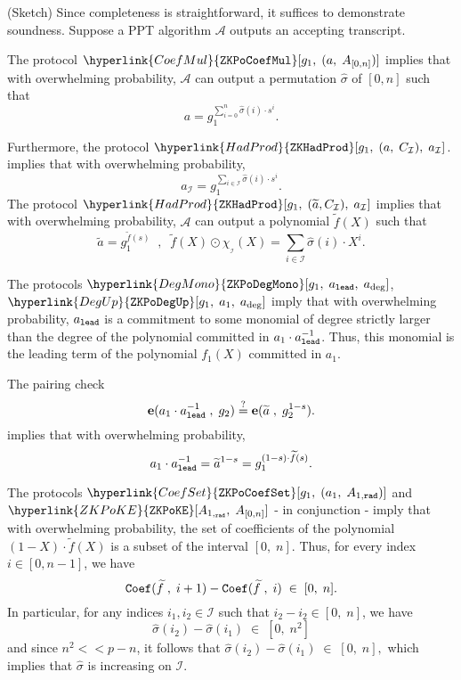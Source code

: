 \documentclass[11pt, lettersize, notitlepage, leqno, footskip=0.6cm]{article}
\newcommand{\wti}{\widetilde}
\newcommand{\mc}{\mathcal}
\newcommand{\mbf}{\mathbf}
\newcommand{\what}{\widehat}
\newcommand{\vs}{\vspace{-0.15cm}}
\newcommand{\noin}{\noindent}
\newcommand{\op}{overwhelming probability}
\newcommand{\sta}{\stackrel{?}{=}}
\newcommand{\e}{\mbf{e}}
\numberwithin{equation}{section}
\begin{document}
\begin{prf} (Sketch) Since completeness is straightforward, it suffices to demonstrate soundness. Suppose a PPT algorithm $\mc{A}$ outputs an accepting transcript.

The protocol $\hyperlink{CoefMul}{\tt{ZKPoCoefMul}}[g_1,\;(a,\;A_{[0,n]})]$ implies that with \op, $\mc{A}$ can output a permutation $\what{\sigma}$ of $[0,n]$ such that \vs $$ a = g_1^{ \sum\limits_{i=0}^n\what{\sigma}(i)\cdot s^i}. $$

\noin Furthermore, the protocol $\hyperlink{HadProd}{\tt{ZKHadProd}}[g_1,\;(a,\;C_{\mc{I}}),\;a_{\mc{I}}]$. implies that with \op, \vs $$  a_{\mc{I}} = g_1^{\sum\limits_{i\in\mc{I}} \what{\sigma}(i)\cdot s^i}.  $$ The protocol $\hyperlink{HadProd}{\tt{ZKHadProd}}[g_1,\;(\wti{a}, C_{\mc{I}}),\;a_{\mc{I}}]$ implies that with \op, $\mc{A}$ can output a polynomial $\wti{f}(X)$ such that $$ \wti{a} = g_1^{\wti{f}(s)}\;\;,\;\;   \wti{f}(X)\odot \chi_{_{\mc{I}}}(X) = \sum\limits_{i\in\mc{I}} \what{\sigma}(i)\cdot X^i . $$

The protocols $\hyperlink{DegMono}{\tt{ZKPoDegMono}}[g_1,\;a_{\tt{lead}},\; a_{\deg}]$, $\hyperlink{DegUp}{\tt{ZKPoDegUp}}[g_1,\;a_1,\; a_{\deg}]$ imply that with \op, $a_{\tt{lead}}$ is a commitment to some monomial of degree strictly larger than the degree of the polynomial committed in $a_1\cdot a_{\tt{lead}}^{-1}$. Thus, this monomial is the leading term of the polynomial $f_1(X)$ committed in $a_1$. 


The pairing check \vs $$ \e(a_1\cdot a_{\tt{lead}}^{-1} \;,\;g_2) \sta \e(\wti{a}\;,\;g_2^{1-s}). $$ implies that with \op, \vs $$a_1\cdot a_{\tt{lead}}^{-1} = \wti{a}^{1-s} = g_1^{(1-s)\cdot \wti{f}(s)}. $$

\noin The protocols $\hyperlink{CoefSet}{\tt{ZKPoCoefSet}}[g_1,\;(a_1,\;A_{1,\tt{rad}})]$ and $\hyperlink{ZKPoKE}{\tt{ZKPoKE}}[A_{1,_{\tt{rad}}},\; A_{[0,n]}]$ - in conjunction - imply that with \op, the set of coefficients of the polynomial $(1-X)\cdot \wti{f}(X)$ is a subset of the interval $[0,\;n]$. Thus, for every index $i\in [0, n-1]$, we have $${{\tt{Coef}}(\wti{f}\;,\;i+1)}- {{\tt{Coef}}(\wti{f}\;,\;i)} \;\in\; [0,\;n]. $$ In particular, for any indices $i_1, i_2\in\mc{I}$ such that $i_2-i_2\in [0,\;n]$, we have \vs $$\what{\sigma}(i_2) - \what{\sigma}(i_1)\;\in\;[0,\;n^2] $$ and since $n^2 << p - n $, it follows that $\what{\sigma}(i_2) - \what{\sigma}(i_1)\;\in\;[0,\;n],$ which implies that $\what{\sigma}$ is increasing on $\mc{I}$. \end{prf}
\end{document}
